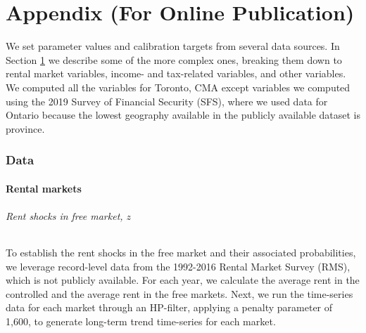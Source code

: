 \documentclass[parskip=full]{article}
\newenvironment{fignote2}[1]
{
\par
\medskip
\begin{minipage}{#1}
\footnotesize
}
{
\end{minipage}
}
\begin{document}
\begin{figure}[H]
\begin{fignote2}{1.0\textwidth}
    \end{fignote2}
\end{figure}
    
\newpage

\appendix

\maketitle


\part*{Appendix (For Online Publication)}

We set parameter values and calibration targets from several data sources. In Section \ref{appendix:data} we describe some of the more complex ones, breaking them down to rental market variables, income- and tax-related variables, and other variables. We computed all the variables for Toronto, CMA except variables we computed using the 2019 Survey of Financial Security (SFS), where we used data for Ontario because the lowest geography available in the publicly available dataset is province.

\section{Data}\label{appendix:data}

\subsection{Rental markets}

\paragraph{Rent shocks in free market, $z$}

To establish the rent shocks in the free market and their associated probabilities, we leverage record-level data from the 1992-2016 Rental Market Survey (RMS), which is not publicly available. For each year, we calculate the average rent in the controlled and the average rent in the free markets. Next, we run the time-series data for each market through an HP-filter, applying a penalty parameter of 1,600, to generate long-term trend time-series for each market.
\end{document}
